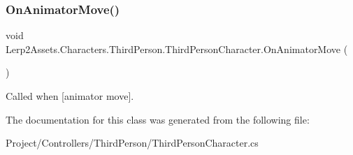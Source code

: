 \subsubsection{\texorpdfstring{On\+Animator\+Move()}{OnAnimatorMove()}}
{\footnotesize\ttfamily void Lerp2\+Assets.\+Characters.\+Third\+Person.\+Third\+Person\+Character.\+On\+Animator\+Move (\begin{DoxyParamCaption}{ }\end{DoxyParamCaption})\hspace{0.3cm}{\ttfamily [inline]}}



Called when \mbox{[}animator move\mbox{]}. 



The documentation for this class was generated from the following file\+:\begin{DoxyCompactItemize}
\item 
Project/\+Controllers/\+Third\+Person/Third\+Person\+Character.\+cs\end{DoxyCompactItemize}
